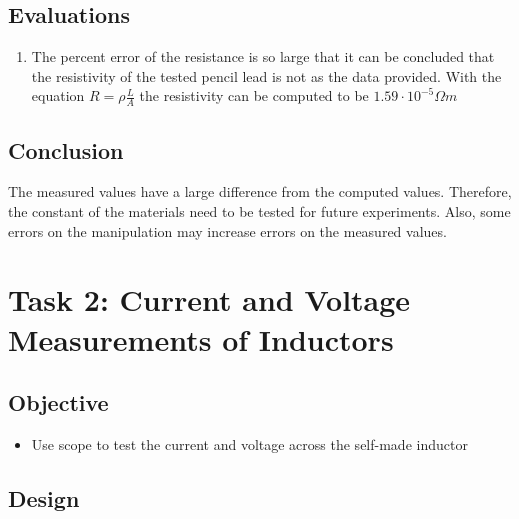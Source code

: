 \documentclass[journal, letterpaper]{IEEEtran}
\begin{document}
    \subsection{Evaluations}
    \begin{enumerate}
    \item The percent error of the resistance is so large that it can be concluded that the resistivity of the tested pencil lead is not as the data provided. With the equation $R = \rho\frac{L}{A}$ the resistivity can be computed to be $1.59\cdot10^{-5}\Omega m$
    \end{enumerate}
    \subsection{Conclusion}
    			The measured values have a large difference from the computed values. Therefore, the constant of the materials need to be tested for future experiments. Also, some errors on the manipulation may increase errors on the measured values. 

\section{\textbf{Task 2: Current and Voltage Measurements of Inductors}}
	\subsection{Objective}
    	\begin{itemize}
    		\item Use scope to test the current and voltage across the self-made inductor
    	\end{itemize}
    \subsection{Design}
\end{document}
